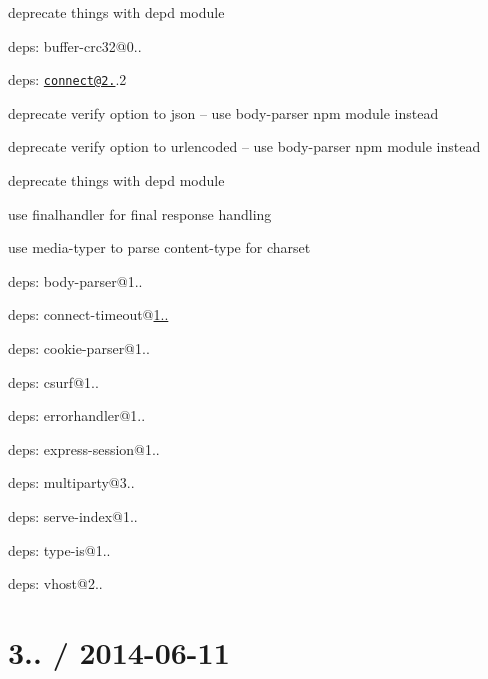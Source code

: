 \begin{DoxyItemize}
\item deprecate things with {\ttfamily depd} module
\item deps\+: buffer-\/crc32@0..
\item deps\+: \href{mailto:connect@2.20}{\tt connect@2.}.2
\begin{DoxyItemize}
\item deprecate {\ttfamily verify} option to {\ttfamily json} -- use {\ttfamily body-\/parser} npm module instead
\item deprecate {\ttfamily verify} option to {\ttfamily urlencoded} -- use {\ttfamily body-\/parser} npm module instead
\item deprecate things with {\ttfamily depd} module
\item use {\ttfamily finalhandler} for final response handling
\item use {\ttfamily media-\/typer} to parse {\ttfamily content-\/type} for charset
\item deps\+: body-\/parser@1..
\item deps\+: connect-\/timeout@\hyperlink{namespace1_1_11_1_11}{1..}
\item deps\+: cookie-\/parser@1..
\item deps\+: csurf@1..
\item deps\+: errorhandler@1..
\item deps\+: express-\/session@1..
\item deps\+: multiparty@3..
\item deps\+: serve-\/index@1..
\item deps\+: type-\/is@1..
\item deps\+: vhost@2..
\end{DoxyItemize}
\end{DoxyItemize}

\section*{3.. / 2014-\/06-\/11 }


